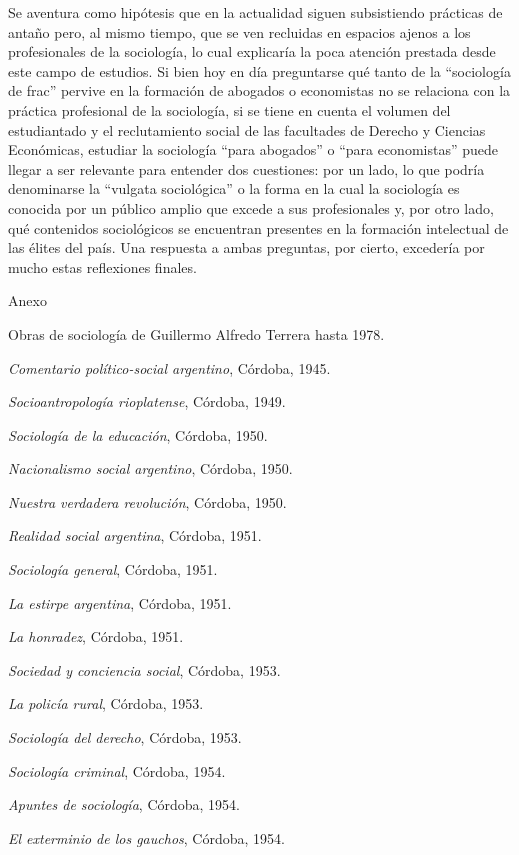 Se aventura como hipótesis que en la actualidad siguen subsistiendo prácticas de antaño pero, al mismo tiempo, que se ven recluidas en espacios ajenos a los profesionales de la sociología, lo cual explicaría la poca atención prestada desde este campo de estudios. Si bien hoy en día preguntarse qué tanto de la \enquote{sociología de frac} pervive en la formación de abogados o economistas no se relaciona con la práctica profesional de la sociología, si se tiene en cuenta el volumen del estudiantado y el reclutamiento social de las facultades de Derecho y Ciencias Económicas, estudiar la sociología \enquote{para abogados} o \enquote{para economistas} puede llegar a ser relevante para entender dos cuestiones: por un lado, lo que podría denominarse la \enquote{vulgata sociológica} o la forma en la cual la sociología es conocida por un público amplio que excede a sus profesionales y, por otro lado, qué contenidos sociológicos se encuentran presentes en la formación intelectual de las élites del país. Una respuesta a ambas preguntas, por cierto, excedería por mucho estas reflexiones finales.

Anexo

Obras de sociología de Guillermo Alfredo Terrera hasta 1978.

\emph{Comentario político-social argentino}, Córdoba, 1945.

\emph{Socioantropología rioplatense}, Córdoba, 1949.

\emph{Sociología de la educación}, Córdoba, 1950.

\emph{Nacionalismo social argentino}, Córdoba, 1950.

\emph{Nuestra verdadera revolución}, Córdoba, 1950.

\emph{Realidad social argentina}, Córdoba, 1951.

\emph{Sociología general}, Córdoba, 1951.

\emph{La estirpe argentina}, Córdoba, 1951.

\emph{La honradez}, Córdoba, 1951.

\emph{Sociedad y conciencia social}, Córdoba, 1953.

\emph{La policía rural}, Córdoba, 1953.

\emph{Sociología del derecho}, Córdoba, 1953.

\emph{Sociología criminal}, Córdoba, 1954.

\emph{Apuntes de sociología}, Córdoba, 1954.

\emph{El exterminio de los gauchos}, Córdoba, 1954.

